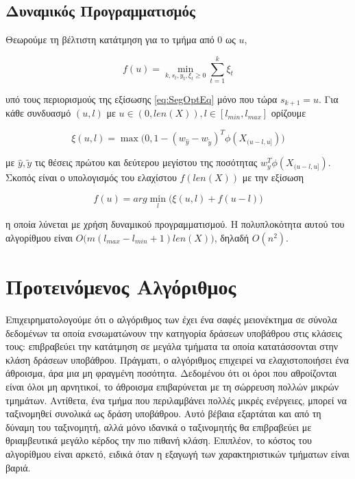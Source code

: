 \documentclass[11pt,a4paper,english,greek,twoside]{../Thesis}
\begin{document}
\subsection{Δυναμικός Προγραμματισμός}
Θεωρούμε τη βέλτιστη κατάτμηση για το τμήμα από 0 ως $u$,

\begin{equation}\label{eq:fOri}
    f(u)=\min_{k,s_t,y_t,\xi_t \geq 0} \sum_{t=1}^k \xi_t
\end{equation}

υπό τους περιορισμούς της εξίσωσης \ref{eq:SegOptEq} μόνο που τώρα $s_{k+1}=u$. Για κάθε συνδυασμό $(u,l)$ με $u \in (0,len(X)), l \in[l_{min},l_{max}]$ ορίζουμε

\begin{equation}\label{eq:ksOri}
    \xi(u,l)=\max \big( 0,1-(w_{\hat{y}}-w_{\tilde{y}})^T \phi(X_{(u-l,u]}) \big)
\end{equation}

με $\hat{y}, \tilde{y}$ τις θέσεις πρώτου και δεύτερου μεγίστου της ποσότητας $w_y^T \phi(X_{(u-l,u]})$. Σκοπός είναι ο υπολογισμός του ελαχίστου $f(len(X))$ με την εξίσωση

\begin{equation}\label{eq:fksOri}
    f(u)=arg\min_l \big( \xi(u,l)+f(u-l) \big)
\end{equation}

η οποία λύνεται με χρήση δυναμικού προγραμματισμού. Η πολυπλοκότητα αυτού του αλγορίθμου είναι $O \big( m (l_{max}-l_{min}+1) len(X) \big)$, δηλαδή $O(n^2)$.


\section{Προτεινόμενος Αλγόριθμος}
Επιχειρηματολογούμε ότι ο αλγόριθμος των \cite{hoai_2011} έχει ένα σαφές μειονέκτημα σε σύνολα δεδομένων τα οποία ενσωματώνουν την κατηγορία δράσεων υποβάθρου στις κλάσεις τους: επιβραβεύει την κατάτμηση σε μεγάλα τμήματα τα οποία κατατάσσονται στην κλάση δράσεων υποβάθρου. Πράγματι, ο αλγόριθμος επιχειρεί να ελαχιστοποιήσει ένα άθροισμα, άρα μια μη φραγμένη ποσότητα. Δεδομένου ότι οι όροι που αθροίζονται είναι όλοι μη αρνητικοί, το άθροισμα επιβαρύνεται με τη σώρρευση πολλών μικρών τμημάτων. Αντίθετα, ένα τμήμα που περιλαμβάνει πολλές μικρές ενέργειες, μπορεί να ταξινομηθεί συνολικά ως δράση υποβάθρου. Αυτό βέβαια εξαρτάται και από τη δύναμη του ταξινομητή, αλλά μόνο ιδανικά ο ταξινομητής θα επιβραβεύει με θριαμβευτικά μεγάλο κέρδος την πιο πιθανή κλάση. Επιπλέον, το κόστος του αλγορίθμου είναι αρκετό, ειδικά όταν η εξαγωγή των χαρακτηριστικών τμήματων είναι βαριά.
\end{document}
